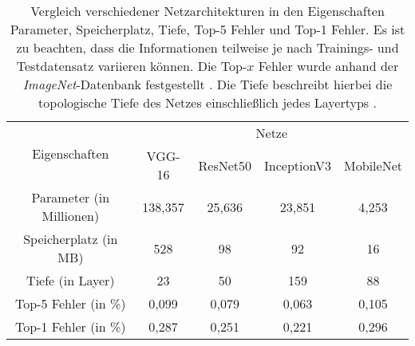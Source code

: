 \begin{table}[H]
	\caption{Vergleich verschiedener Netzarchitekturen in den Eigenschaften Parameter, Speicherplatz, Tiefe, Top-5 Fehler und Top-1 Fehler. Es ist zu beachten, dass die Informationen teilweise je nach Trainings- und Testdatensatz variieren können. Die Top-$x$ Fehler wurde anhand der \textit{ImageNet}-Datenbank festgestellt \cite{keras}. Die Tiefe beschreibt hierbei die topologische Tiefe des Netzes einschließlich jedes Layertyps \cite{keras}.}
	\begin{center}
		\begin{tabular}{|c|c|c|c|c|}
			\hline
			\multirow{2}{*}{Eigenschaften}& \multicolumn{4}{c|}{\centering Netze} \\
			\cline{2-5} & \multicolumn{1}{c|}{VGG-16} & \multicolumn{1}{c|}{ResNet50} & \multicolumn{1}{c|}{InceptionV3} & \multicolumn{1}{c|}{MobileNet} \\ \hline
			Parameter (in Millionen)	& 138,357 	& 25,636 	& 23,851 	& 4,253 \\
			Speicherplatz (in MB)		& 528 		& 98 		& 92 		& 16 \\
			Tiefe (in Layer) 			& 23 		& 50			& 159 		& 88 \\
			Top-5 Fehler (in \%)	& 0,099 	& 0,079 	& 0,063		& 0,105 \\
			Top-1 Fehler (in \%) 	& 0,287 	& 0,251 	& 0,221		& 0,296 \\
			\hline
		\end{tabular}
	\end{center}

	\label{fig: cnnvergleich}
\end{table}